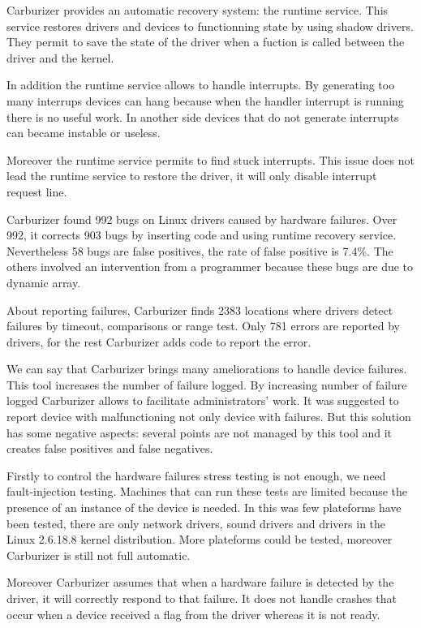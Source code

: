 \documentclass[11pt]{article}
\begin{document}
Carburizer provides an automatic recovery system: the runtime service. This service restores drivers and devices to functionning state by using shadow drivers. They permit to save  the state of the driver when a fuction is called between the driver and the kernel.

In addition the runtime service allows to handle interrupts. By generating too many interrups devices can hang because when the handler interrupt is running there is no useful work. In another side devices that do not generate interrupts can became instable or useless. 

Moreover the runtime service permits to find stuck interrupts. This issue does not lead the runtime service to restore the driver, it will only disable interrupt request line.

\vspace{0.5cm}
Carburizer found 992 bugs on Linux drivers caused by hardware failures. Over 992, it corrects 903 bugs by inserting code and using runtime recovery service. Nevertheless 58 bugs are false positives, the rate of false positive is 7.4\%. The others involved an intervention from a programmer because these bugs are due to dynamic array. 

About reporting failures, Carburizer finds 2383 locations where drivers detect failures by timeout, comparisons or range test. Only 781 errors are reported by drivers, for the rest Carburizer adds code to report the error.

\vspace{0.5cm}
We can say that Carburizer brings many ameliorations to handle device failures. This tool increases the number of failure logged. By increasing number of failure logged Carburizer allows to facilitate administrators' work. It was suggested to report device with malfunctioning not only device with failures. But this solution has some negative aspects: several points are not managed by this tool and it creates false positives and false negatives.

Firstly to control the hardware failures stress testing is not enough, we need fault-injection testing. Machines that can run these tests are limited because the presence of an instance of the device is needed. In this was few plateforms have been tested, there are only network drivers, sound drivers and drivers in the Linux 2.6.18.8 kernel distribution. More plateforms could be tested, moreover Carburizer is still not full automatic.

Moreover Carburizer assumes that when a hardware failure is detected by the driver, it will correctly respond to that failure. It does not handle crashes that occur when a device received a flag from the driver whereas it is not ready.
\end{document}
